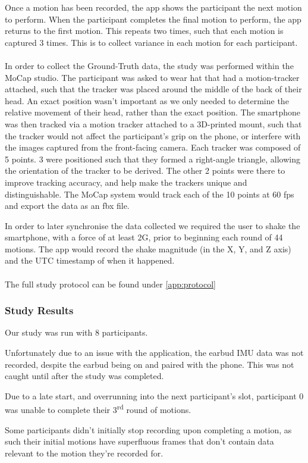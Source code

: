 Once a motion has been recorded, the app shows the participant the next motion to perform. When the participant completes the final motion to perform, the app returns to the first motion. This repeats two times, such that each motion is captured 3 times. This is to collect variance in each motion for each participant.
\\\\
In order to collect the Ground-Truth data, the study was performed within the MoCap studio. The participant was asked to wear hat that had a motion-tracker attached, such that the tracker was placed around the middle of the back of their head. An exact position wasn't important as we only needed to determine the relative movement of their head, rather than the exact position.
The smartphone was then tracked via a motion tracker attached to a 3D-printed mount, such that the tracker would not affect the participant's grip on the phone, or interfere with the images captured from the front-facing camera.
Each tracker was composed of 5 points. 3 were positioned such that they formed a right-angle triangle, allowing the orientation of the tracker to be derived. The other 2 points were there to improve tracking accuracy, and help make the trackers unique and distinguishable.
The MoCap system would track each of the 10 points at 60 fps and export the data as an fbx file.

In order to later synchronise the data collected we required the user to shake the smartphone, with a force of at least 2G, prior to beginning each round of 44 motions. The app would record the shake magnitude (in the X, Y, and Z axis) and the UTC timestamp of when it happened.
\\\\
The full study protocol can be found under \autoref{app:protocol}

\subsubsection{Study Results}
Our study was run with 8 participants.

Unfortunately due to an issue with the application, the earbud IMU data was not recorded, despite the earbud being on and paired with the phone. This was not caught until after the study was completed.

Due to a late start, and overrunning into the next participant's slot, participant 0 was unable to complete their 3\textsuperscript{rd} round of motions.

Some participants didn't initially stop recording upon completing a motion, as such their initial motions have superfluous frames that don't contain data relevant to the motion they're recorded for.


